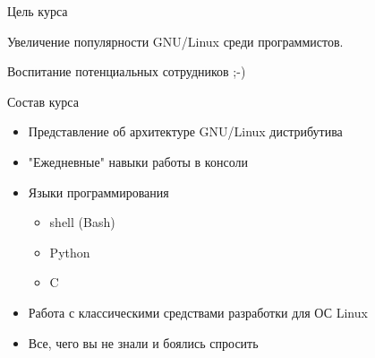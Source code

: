 \begin{frame}{Цель курса}
	\begin{center}
		\Huge
		Увеличение популярности GNU/Linux среди программистов.

		\hrulefill

		\normalsize
		Воспитание потенциальных сотрудников ;-)
	\end{center}
\end{frame}


\begin{frame}{Состав курса}
	\begin{itemize}
		\item Представление об архитектуре GNU/Linux дистрибутива
			\pause
		\item "Ежедневные" навыки работы в консоли
			\pause
		\item Языки программирования
			\begin{itemize}
					\item shell (Bash)
					\item Python
					\item C
			\end{itemize}
			\pause
		\item Работа с классическими средствами разработки для ОС Linux
			\pause
		\item Все, чего вы не знали и боялись спросить
	\end{itemize}
\end{frame}
